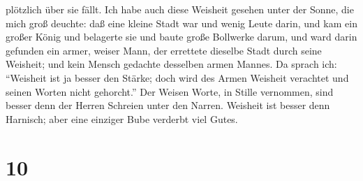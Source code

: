 plötzlich über sie fällt.  Ich habe auch diese Weisheit
gesehen unter der Sonne, die mich groß deuchte:  daß eine
kleine Stadt war und wenig Leute darin, und kam ein großer König und
belagerte sie und baute große Bollwerke darum,  und ward
darin gefunden ein armer, weiser Mann, der errettete dieselbe Stadt
durch seine Weisheit; und kein Mensch gedachte desselben armen Mannes.
 Da sprach ich: ``Weisheit ist ja besser den Stärke; doch
wird des Armen Weisheit verachtet und seinen Worten nicht gehorcht.''
 Der Weisen Worte, in Stille vernommen, sind besser denn
der Herren Schreien unter den Narren.  Weisheit ist besser
denn Harnisch; aber eine einziger Bube verderbt viel Gutes.

\hypertarget{section-9}{%
\section{10}\label{section-9}}


